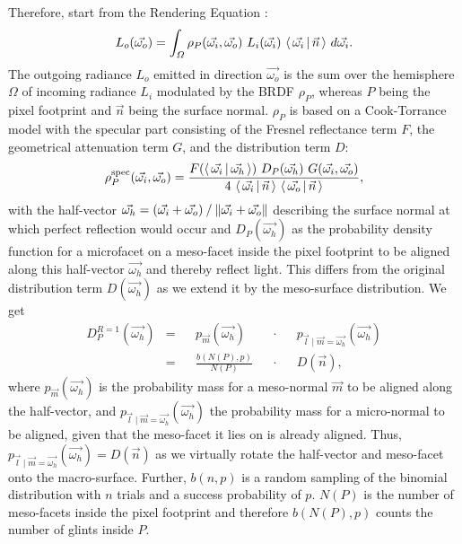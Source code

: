 Therefore, \textcite{deliot2023} start from the Rendering Equation \parencite{kajiya1986, immel1986}:
%
\begin{equation}
    L_o(\vec{\omega_o}) =
    \int_{\Omega}
        \rho_P(\vec{\omega_i}, \vec{\omega_o})~
        L_i(\vec{\omega_i})~
        \dotproduct{\vec{\omega_i}}{\vec{n}}~
    d\vec{\omega_i}.
\end{equation}
%
The outgoing radiance $L_o$ emitted in direction $\vec{\omega_o}$ is the sum over the hemisphere $\Omega$ of incoming radiance $L_i$ modulated by the BRDF $\rho_P$, whereas $P$ being the pixel footprint and $\vec{n}$ being the surface normal.
%
$\rho_P$ is based on a Cook-Torrance model \parencite{cook1982} with the specular part consisting of the Fresnel reflectance term $F$, the geometrical attenuation term $G$, and the distribution term $D$:
%
\begin{equation}
    \rho_P^\text{spec}(\vec{\omega_i}, \vec{\omega_o}) = \frac{
        F(\dotproduct{\vec{\omega_i}}{\vec{\omega_h}})~
        D_P(\vec{\omega_h})~
        G(\vec{\omega_i}, \vec{\omega_o})
    }{
        4~
        \dotproduct{\vec{\omega_i}}{\vec{n}}~
        \dotproduct{\vec{\omega_o}}{\vec{n}}
    },
\end{equation}
%
with the half-vector $\vec{\omega_h}=\flatnormalize{\vec{\omega_i} + \vec{\omega_o}}$ describing the surface normal at which perfect reflection would occur and $D_P(\vec{\omega_h})$ as the probability density function for a microfacet on a meso-facet inside the pixel footprint to be aligned along this half-vector $\vec{\omega_h}$ and thereby reflect light.
%
This differs from the original distribution term $D(\vec{\omega_h})$ as we extend it by the meso-surface distribution.
%
We get
%
\begin{equation}
\begin{aligned}
    D_P^{R=1}(\vec{\omega_h})
    & = && p_{\vec{m}}(\vec{\omega_h}) && \cdot && p_{\vec{l} \mid \vec{m} = \vec{\omega_h}}(\vec{\omega_h}) \\
    & = && \frac{b(N(P), p)}{N(P)} && \cdot && D(\vec{n}),
\end{aligned}
\end{equation}
%
where $p_{\vec{m}}(\vec{\omega_h})$ is the probability mass for a meso-normal $\vec{m}$ to be aligned along the half-vector, and $p_{\vec{l} \mid \vec{m} = \vec{\omega_h}}(\vec{\omega_h})$ the probability mass for a micro-normal to be aligned, given that the meso-facet it lies on is already aligned.
%
Thus, $p_{\vec{l} \mid \vec{m} = \vec{\omega_h}}(\vec{\omega_h})=D(\vec{n})$ as we virtually rotate the half-vector and meso-facet onto the macro-surface.
%
Further, $b(n, p)$ is a random sampling of the binomial distribution with $n$ trials and a success probability of $p$. $N(P)$ is the number of meso-facets inside the pixel footprint and therefore $b(N(P), p)$ counts the number of glints inside $P$.

